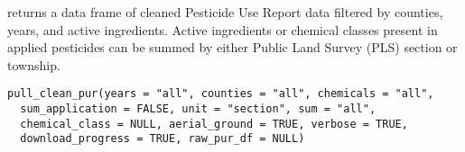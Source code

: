 \documentclass[a4paper]{book}
\begin{document}
%
\begin{Description}\relax
{} returns a data frame of cleaned Pesticide Use Report data
filtered by counties, years, and active ingredients. Active ingredients
or chemical classes present in applied pesticides can be summed by either
Public Land Survey (PLS) section or township.
\end{Description}
%
\begin{Usage}
\begin{verbatim}
pull_clean_pur(years = "all", counties = "all", chemicals = "all",
  sum_application = FALSE, unit = "section", sum = "all",
  chemical_class = NULL, aerial_ground = TRUE, verbose = TRUE,
  download_progress = TRUE, raw_pur_df = NULL)
\end{verbatim}
\end{Usage}
%
\end{document}
